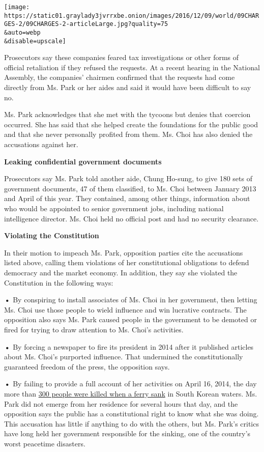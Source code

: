 \texttt{[image: https://static01.graylady3jvrrxbe.onion/images/2016/12/09/world/09CHARGES-2/09CHARGES-2-articleLarge.jpg?quality=75\\\&auto=webp\\\&disable=upscale]}

Prosecutors say these companies feared tax investigations or other forms
of official retaliation if they refused the requests. At a recent
hearing in the National Assembly, the companies' chairmen confirmed that
the requests had come directly from Ms. Park or her aides and said it
would have been difficult to say no.

Ms. Park acknowledges that she met with the tycoons but denies that
coercion occurred. She has said that she helped create the foundations
for the public good and that she never personally profited from them.
Ms. Choi has also denied the accusations against her.

\textbf{Leaking confidential government documents}

Prosecutors say Ms. Park told another aide, Chung Ho-sung, to give 180
sets of government documents, 47 of them classified, to Ms. Choi between
January 2013 and April of this year. They contained, among other things,
information about who would be appointed to senior government jobs,
including national intelligence director. Ms. Choi held no official post
and had no security clearance.

\textbf{Violating the Constitution}

In their motion to impeach Ms. Park, opposition parties cite the
accusations listed above, calling them violations of her constitutional
obligations to defend democracy and the market economy. In addition,
they say she violated the Constitution in the following ways:

\textbf{•} By conspiring to install associates of Ms. Choi in her
government, then letting Ms. Choi use those people to wield influence
and win lucrative contracts. The opposition also says Ms. Park caused
people in the government to be demoted or fired for trying to draw
attention to Ms. Choi's activities.

\textbf{•} By forcing a newspaper to fire its president in 2014 after it
published articles about Ms. Choi's purported influence. That undermined
the constitutionally guaranteed freedom of the press, the opposition
says.

\textbf{•} By failing to provide a full account of her activities on
April 16, 2014, the day more than
\href{http://www.nytimes3xbfgragh.onion/2015/04/12/world/asia/legacy-of-south-korea-sewol-ferry-sinking.html}{300
people were killed when a ferry sank} in South Korean waters. Ms. Park
did not emerge from her residence for several hours that day, and the
opposition says the public has a constitutional right to know what she
was doing. This accusation has little if anything to do with the others,
but Ms. Park's critics have long held her government responsible for the
sinking, one of the country's worst peacetime disasters.

